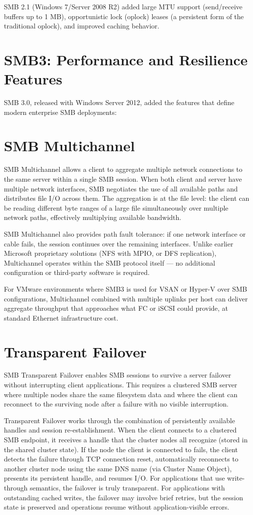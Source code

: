 SMB 2.1 (Windows 7/Server 2008 R2) added large MTU support (send/receive buffers up to 1 MB), opportunistic lock (oplock) leases (a persistent form of the traditional oplock), and improved caching behavior.

\section{SMB3: Performance and Resilience Features}
SMB 3.0, released with Windows Server 2012, added the features that define modern enterprise SMB deployments:

\section{SMB Multichannel}
SMB Multichannel allows a client to aggregate multiple network connections to the same server within a single SMB session. When both client and server have multiple network interfaces, SMB negotiates the use of all available paths and distributes file I/O across them. The aggregation is at the file level: the client can be reading different byte ranges of a large file simultaneously over multiple network paths, effectively multiplying available bandwidth.

SMB Multichannel also provides path fault tolerance: if one network interface or cable fails, the session continues over the remaining interfaces. Unlike earlier Microsoft proprietary solutions (NFS with MPIO, or DFS replication), Multichannel operates within the SMB protocol itself --- no additional configuration or third-party software is required.

For VMware environments where SMB3 is used for VSAN or Hyper-V over SMB configurations, Multichannel combined with multiple uplinks per host can deliver aggregate throughput that approaches what FC or iSCSI could provide, at standard Ethernet infrastructure cost.

\section{Transparent Failover}
SMB Transparent Failover enables SMB sessions to survive a server failover without interrupting client applications. This requires a clustered SMB server where multiple nodes share the same filesystem data and where the client can reconnect to the surviving node after a failure with no visible interruption.

Transparent Failover works through the combination of persistently available handles and session re-establishment. When the client connects to a clustered SMB endpoint, it receives a handle that the cluster nodes all recognize (stored in the shared cluster state). If the node the client is connected to fails, the client detects the failure through TCP connection reset, automatically reconnects to another cluster node using the same DNS name (via Cluster Name Object), presents its persistent handle, and resumes I/O. For applications that use write-through semantics, the failover is truly transparent. For applications with outstanding cached writes, the failover may involve brief retries, but the session state is preserved and operations resume without application-visible errors.

